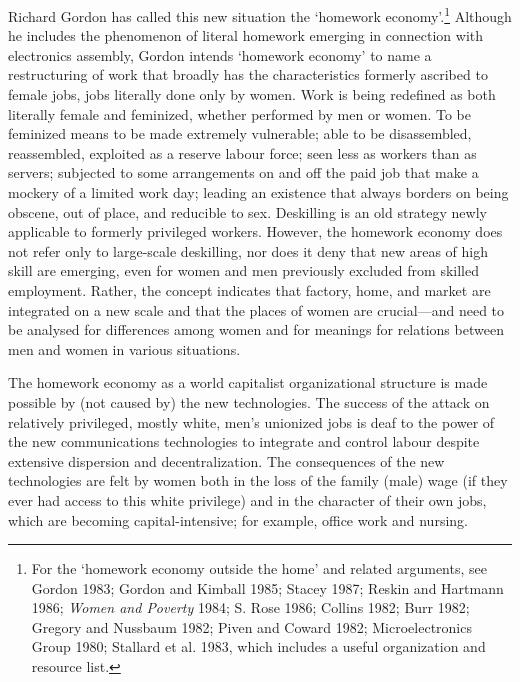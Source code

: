 \documentclass[DIV=12,%
               BCOR=10mm,%
               headinclude=false,%
               footinclude=false,open=any,%
               fontsize=11pt,%
               twoside,%
               paper=210mm:11in]%
               {scrbook}
\begin{document}
Richard Gordon has called this new situation the ‘homework economy’.\footnote{For the ‘homework economy outside the home’ and related arguments, see Gordon 1983; Gordon and Kimball 1985; Stacey 1987; Reskin and Hartmann 1986; \emph{Women and Poverty} 1984; S. Rose 1986; Collins 1982; Burr 1982; Gregory and Nussbaum 1982; Piven and Coward 1982; Microelectronics Group 1980; Stallard et al. 1983, which includes a useful organization and resource list.} Although he includes the phenomenon of literal homework emerging in connection with electronics assembly, Gordon intends ‘homework economy’ to name a restructuring of work that broadly has the characteristics formerly ascribed to female jobs, jobs literally done only by women. Work is being redefined as both literally female and feminized, whether performed by men or women. To be feminized means to be made extremely vulnerable; able to be disassembled, reassembled, exploited as a reserve labour force; seen less as workers than as servers; subjected to some arrangements on and off the paid job that make a mockery of a limited work day; leading an existence that always borders on being obscene, out of place, and reducible to sex. Deskilling is an old strategy newly applicable to formerly privileged workers. However, the homework economy does not refer only to large-scale deskilling, nor does it deny that new areas of high skill are emerging, even for women and men previously excluded from skilled employment. Rather, the concept indicates that factory, home, and market are integrated on a new scale and that the places of women are crucial—and need to be analysed for differences among women and for meanings for relations between men and women in various situations.


The homework economy as a world capitalist organizational structure is made possible by (not caused by) the new technologies. The success of the attack on relatively privileged, mostly white, men’s unionized jobs is deaf to the power of the new communications technologies to integrate and control labour despite extensive dispersion and decentralization. The consequences of the new technologies are felt by women both in the loss of the family (male) wage (if they ever had access to this white privilege) and in the character of their own jobs, which are becoming capital-intensive; for example, office work and nursing.
\end{document}
